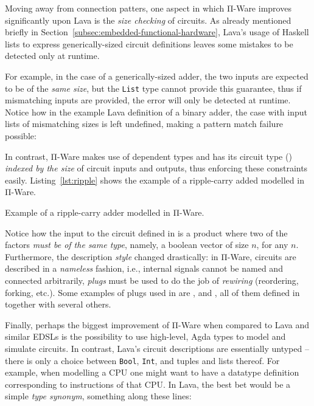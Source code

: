         Moving away from connection patters, one aspect in which Π-Ware improves significantly
        upon Lava is the \emph{size checking} of circuits.
        As already mentioned briefly in Section~\ref{subsec:embedded-functional-hardware},
        Lava's usage of Haskell lists to express generically-sized circuit definitions leaves some
        mistakes to be detected only at runtime.

        For example, in the case of a generically-sized adder, the two inputs are expected to be
        of the \emph{same size}, but the \texttt{List} type cannot provide this guarantee,
        thus if mismatching inputs are provided, the error will only be detected at runtime.
        Notice how in the example Lava definition of a binary adder,
        the case with input lists of mismatching sizes is left undefined,
        making a pattern match failure possible:

        \begin{center}
        \end{center}

        In contrast, Π-Ware makes use of dependent types and has its circuit type ()
        \emph{indexed by the size} of circuit inputs and outputs, thus enforcing these constraints easily.
        Listing~\ref{lst:ripple} shows the example of a ripple-carry added modelled in Π-Ware.

        \begin{listing}[h]
            \caption{Example of a ripple-carry adder modelled in Π-Ware.\label{lst:ripple}}
        \end{listing}

        Notice how the input to the circuit defined in  is a product where two of the factors
        \emph{must be of the same type}, namely, a boolean vector of size $n$, for any $n$.
        Furthermore, the description \emph{style} changed drastically: in Π-Ware, circuits are described
        in a \emph{nameless} fashion, i.e., internal signals cannot be named and connected arbitrarily,
        \emph{plugs} must be used to do the job of \emph{rewiring} (reordering, forking, etc.).
        Some examples of plugs used in  are ,  and ,
        all of them defined in  together with several others.

        Finally, perhaps the biggest improvement of Π-Ware when compared to Lava and similar \acp{EDSL}
        is the possibility to use high-level, Agda types to model and simulate circuits.
        In contrast, Lava's circuit descriptions are essentially untyped – there is only a choice
        between \texttt{Bool}, \texttt{Int}, and tuples and lists thereof.
        For example, when modelling a CPU one might want to have a datatype definition corresponding
        to instructions of that CPU. In Lava, the best bet would be a simple \emph{type synonym},
        something along these lines:

